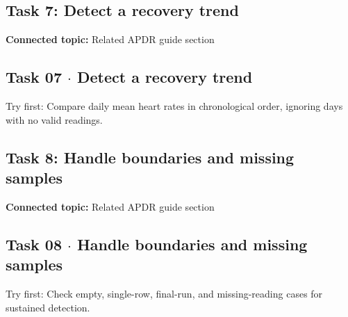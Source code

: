 \documentclass[11pt]{article}
\begin{document}
\begin{keepsection}
\section{Task 7: Detect a recovery trend}

\textbf{Connected topic:} Related APDR guide section

\begin{keepsection}
\subsection{Task 07 \ensuremath{\cdot} Detect a recovery trend}

Try first: Compare daily mean heart rates in chronological order, ignoring days with no valid readings.

\end{keepsection}
\end{keepsection}

\begin{keepsection}
\section{Task 8: Handle boundaries and missing samples}

\textbf{Connected topic:} Related APDR guide section

\begin{keepsection}
\subsection{Task 08 \ensuremath{\cdot} Handle boundaries and missing samples}

Try first: Check empty, single-row, final-run, and missing-reading cases for sustained detection.

\end{keepsection}
\end{keepsection}
\end{document}
